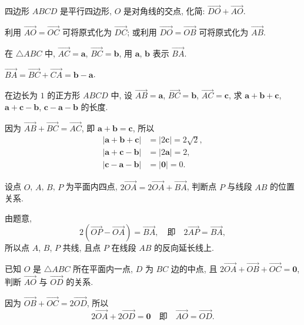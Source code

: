 \begin{exercise}
    四边形 $ABCD$ 是平行四边形, $O$ 是对角线的交点, 化简: $\overrightarrow{DO}+ \overrightarrow{AO}$.
\end{exercise}
\beginsolution
    利用 $\overrightarrow{AO}= \overrightarrow{OC}$ 可将原式化为 $\overrightarrow{DC}$; 或利用 $\overrightarrow{DO}= \overrightarrow{OB}$ 可将原式化为 $\overrightarrow{AB}$.
\endsolution

\begin{exercise}
    在 $\triangle ABC$ 中, $\overrightarrow{AC}=\bm{a}$, 
    $\overrightarrow{BC}=\bm{b}$, 用 $\bm{a}$, $\bm{b}$ 
    表示 $\overrightarrow{BA}$.
\end{exercise}
\beginsolution
    $\overrightarrow{BA}= \overrightarrow{BC}+ \overrightarrow{CA}
    = \bm{b}- \bm{a}$.
\endsolution

\begin{exercise}
    在边长为 $1$ 的正方形 $ABCD$ 中, 设 $\overrightarrow{AB}= \bm{a}$, $\overrightarrow{BC}= \bm{b}$, $\overrightarrow{AC}= \bm{c}$, 求 $\bm{a}+ \bm{b}+ \bm{c}$, $\bm{a}+ \bm{c}- \bm{b}$, $\bm{c}- \bm{a}- \bm{b}$ 的长度.
\end{exercise}
\beginsolution
    因为 $\overrightarrow{AB}+ \overrightarrow{BC}= \overrightarrow{AC}$, 即 $\bm{a}+\bm{b}= \bm{c}$, 所以 
    \[\begin{aligned}
        |\bm{a}+ \bm{b}+ \bm{c}|
        &= |2\bm{c}|= 2\sqrt2,\\
        |\bm{a}+ \bm{c}- \bm{b}|
        &= |2\bm{a}|= 2,\\
        |\bm{c}- \bm{a}- \bm{b}|
        &= |\bm{0}|= 0.
    \end{aligned}\]
\endsolution

\begin{exercise}
    设点 $O$, $A$, $B$, $P$ 为平面内四点, $2\overrightarrow{OA}= 2\overrightarrow{OA}+ \overrightarrow{BA}$, 判断点 $P$ 与线段 $AB$ 的位置关系.
\end{exercise}
\beginsolution
    由题意,
    \[2(\overrightarrow{OP}- \overrightarrow{OA})
    = \overrightarrow{BA},\quad\text{即}\quad
    2\overrightarrow{AP}= \overrightarrow{BA},\]
    所以点 $A$, $B$, $P$ 共线, 且点 $P$ 在线段 $AB$ 的反向延长线上.
\endsolution

\begin{exercise}
    已知 $O$ 是 $\triangle ABC$ 所在平面内一点, $D$ 为 $BC$ 边的中点,
    且 $2\overrightarrow{OA}+ \overrightarrow{OB}+ \overrightarrow{OC}=\bm{0}$, 判断 $\overrightarrow{AO}$ 与 $\overrightarrow{OD}$ 的关系.
\end{exercise}
\beginsolution
    因为 $\overrightarrow{OB}+ \overrightarrow{OC}= 2\overrightarrow{OD}$, 所以
    \[2\overrightarrow{OA}+ 2\overrightarrow{OD}= \bm{0}
    \quad\text{即}\quad \overrightarrow{AO}= \overrightarrow{OD}.\]
\endsolution

